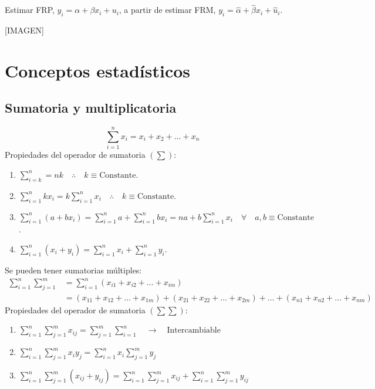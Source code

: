 \documentclass[
]{book}
\providecommand{\tightlist}{%
  \setlength{\itemsep}{0pt}\setlength{\parskip}{0pt}}
\begin{document}
Estimar FRP, \(y_i = \alpha + \beta x_i + u_i\), a partir de estimar FRM, \(y_i = \hat \alpha + \hat \beta x_i + \hat u_i\).

{[}IMAGEN{]}

\hypertarget{conceptos-estaduxedsticos}{%
\section{Conceptos estadísticos}\label{conceptos-estaduxedsticos}}

\hypertarget{sumatoria-y-multiplicatoria}{%
\subsection{Sumatoria y multiplicatoria}\label{sumatoria-y-multiplicatoria}}

\[
\sum_{i=1}^n x_i = x_i + x_2 + \ldots + x_n
\]
Propiedades del operador de sumatoria \((\sum)\):

\begin{enumerate}
\def\labelenumi{\arabic{enumi}.}
\tightlist
\item
  \(\sum_{i=k}^n = nk \quad \therefore \quad k \equiv \text{Constante}\).
\item
  \(\sum_{i=1}^n k x_i = k\sum_{i=1}^nx_i \quad \therefore \quad k \equiv \text{Constante}\).
\item
  \(\sum_{i=1}^n (a+bx_i) = \sum_{i=1}^n a + \sum_{i=1}^n bx_i = na + b \sum_{i=1}^n x_i \quad \forall \quad a,b \equiv \text{Constante}\).
\item
  \(\sum_{i=1}^n (x_i + y_i) = \sum_{i=1}^nx_i + \sum_{i=1}^n y_i\).
\end{enumerate}

Se pueden tener sumatorias múltiples:
\[
\begin{aligned}
\sum_{i=1}^n\sum_{j=1}^m &= \sum_{i=1}^n (x_{i1} + x_{i2} + \ldots + x_{im}) \\
&= (x_{11} + x_{12} + \ldots + x_{1m}) + (x_{21} + x_{22} + \ldots + x_{2m})  + \ldots + (x_{n1} + x_{n2} + \ldots + x_{nm})
\end{aligned}
\]
Propiedades del operador de sumatoria \((\sum \sum)\):

\begin{enumerate}
\def\labelenumi{\arabic{enumi}.}
\tightlist
\item
  \(\sum_{i=1}^n\sum_{j=1}^m x_{ij} = \sum_{j=1}^m\sum_{i=1}^n \quad \rightarrow \quad \text{Intercambiable}\)
\item
  \(\sum_{i=1}^n\sum_{j=1}^m x_i y_j = \sum_{i=1}^n x_i \sum_{j=1}^m y_j\)
\item
  \(\sum_{i=1}^n\sum_{j=1}^m (x_{ij} + y_{ij}) = \sum_{i=1}^n\sum_{j=1}^m x_{ij} + \sum_{i=1}^n\sum_{j=1}^m y_{ij}\)
\end{enumerate}
\end{document}
